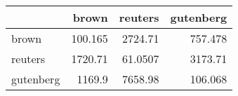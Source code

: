 \begin{tabular}{lrrr}
\hline
           &    brown &   reuters &   gutenberg \\
\hline
 brown     &  100.165 & 2724.71   &     757.478 \\
 reuters   & 1720.71  &   61.0507 &    3173.71  \\
 gutenberg & 1169.9   & 7658.98   &     106.068 \\
\hline
\end{tabular}